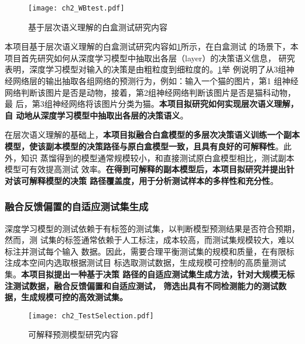 \begin{figure}[htp]
    \begin{small}
        \begin{center}
            \texttt{[image: ch2\_WBtest.pdf]}
        \end{center}
        \caption{基于层次语义理解的白盒测试研究内容}
        \label{fig:ch2:WBtest}
    \end{small}
\end{figure}

本项目基于层次语义理解的白盒测试研究内容如\cref{fig:ch2:WBtest}所示，在白盒测试
的场景下，本项目首先研究如何从深度学习模型中抽取出各层（layer）的决策语义信息，
研究表明，深度学习模型对输入的决策是由粗粒度到细粒度的。\cref{fig:ch2:WBtest}举
例说明了从3组神经网络层的输出抽取各组网络的预测行为，例如：输入一个猫的图片，第1
组神经网络判断该图片是否是动物，接着，第2组神经网络判断该图片是否是猫科动物，最
后，第3组神经网络将该图片分类为猫。\textbf{本项目拟研究如何实现层次语义理解，自
    动地从深度学习模型中抽取出各层的决策语义}。

在层次语义理解的基础上，\textbf{本项目拟融合白盒模型的多层次决策语义训练一个副本
    模型，使该副本模型的决策路径与原白盒模型一致，且具有良好的可解释性}。此外，知识
蒸馏得到的模型通常规模较小，和直接测试原白盒模型相比，测试副本模型可有效提高测试
效率。\textbf{在得到可解释的副本模型后，本项目拟研究并提出针对该可解释模型的决策
    路径覆盖度，用于分析测试样本的多样性和充分性}。

\subsubsection{融合反馈偏置的自适应测试集生成}
深度学习模型的测试依赖于有标签的测试集，以判断模型预测结果是否符合预期，然而，测
试集的标签通常依赖于人工标注，成本较高，而测试集规模较大，难以标注并测试每个输入
数据。因此，{需要合理平衡测试集的规模和质量，在有限标注成本空间内选取根据测试目
标选取测试数据，生成规模可控制的高质量测试集}。\textbf{本项目拟提出一种基于决策
    路径的自适应测试集生成方法，针对大规模无标注测试数据，融合反馈偏置和自适应测试，
    筛选出具有不同检测能力的测试数据，生成规模可控的高效测试集。}

\begin{figure}[htp]
    \begin{small}
        \begin{center}
            \texttt{[image: ch2\_TestSelection.pdf]}
        \end{center}
        \caption{可解释预测模型研究内容}
        \label{fig:ch2:testselection}
    \end{small}
\end{figure}

